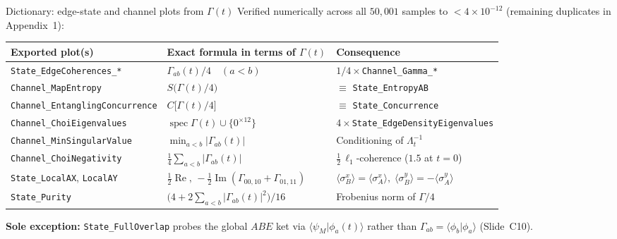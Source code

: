 \documentclass[aspectratio=169,11pt]{beamer}
\newcommand{\spec}{\operatorname{spec}}
\newcommand{\mutednote}[1]{{\color{muted}\scriptsize #1}}
\begin{document}
\begin{frame}{Dictionary: edge-state and channel plots from $\Gamma(t)$}
\footnotesize
Verified numerically across all $50{,}001$ samples to $<4\times 10^{-12}$ (remaining duplicates in Appendix~1):
\smallskip
\begin{center}
\scriptsize\setlength{\tabcolsep}{4pt}
\begin{tabular}{@{}lll@{}}
\toprule
Exported plot(s) & Exact formula in terms of $\Gamma(t)$ & Consequence \\\midrule
\texttt{State\_EdgeCoherences\_*} & $\Gamma_{ab}(t)/4\quad(a<b)$ & $1/4\times$\texttt{Channel\_Gamma\_*} \\
\texttt{Channel\_MapEntropy} & $S\bigl(\Gamma(t)/4\bigr)$ & $\equiv$ \texttt{State\_EntropyAB} \\
\texttt{Channel\_EntanglingConcurrence} & $C\bigl[\Gamma(t)/4\bigr]$ & $\equiv$ \texttt{State\_Concurrence} \\
\texttt{Channel\_ChoiEigenvalues} & $\spec\Gamma(t)\cup\{0^{\times 12}\}$ & $4\times$\texttt{State\_EdgeDensityEigenvalues} \\
\texttt{Channel\_MinSingularValue} & $\min_{a<b}\lvert\Gamma_{ab}(t)\rvert$ & Conditioning of $\Lambda_t^{-1}$ \\
\texttt{Channel\_ChoiNegativity} & $\tfrac14\sum_{a<b}\lvert\Gamma_{ab}(t)\rvert$ & $\tfrac12\,\ell_1$-coherence ($1.5$ at $t=0$) \\
\texttt{State\_LocalAX}, \texttt{LocalAY} & $\tfrac12\operatorname{Re},\,-\tfrac12\operatorname{Im}(\Gamma_{00,10}+\Gamma_{01,11})$ & $\langle\sigma_B^x\rangle=\langle\sigma_A^x\rangle,\;\langle\sigma_B^y\rangle=-\langle\sigma_A^y\rangle$ \\
\texttt{State\_Purity} & $\bigl(4+2\sum_{a<b}\lvert\Gamma_{ab}(t)\rvert^2\bigr)/16$ & Frobenius norm of $\Gamma/4$ \\\bottomrule
\end{tabular}
\end{center}
\smallskip
\mutednote{\textbf{Sole exception:} \texttt{State\_FullOverlap} probes the global $ABE$ ket via $\langle\psi_M\vert\phi_a(t)\rangle$ rather than $\Gamma_{ab}=\langle\phi_b\vert\phi_a\rangle$ (Slide~C10).}
\end{frame}
\end{document}
